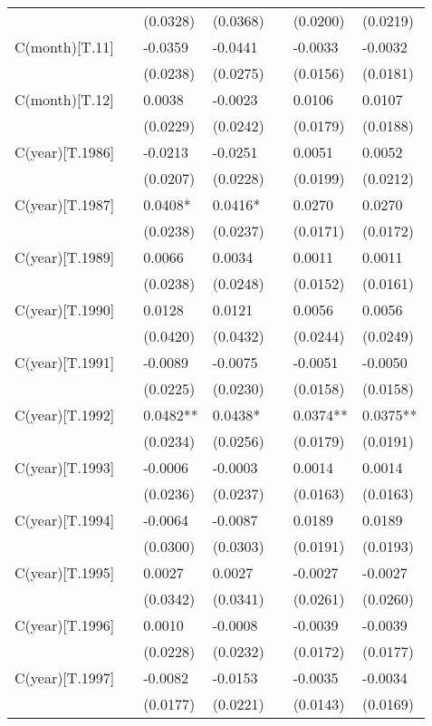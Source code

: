 \begin{tabular}{lllllll}
 &  & (0.0328) & (0.0368) &  & (0.0200) & (0.0219) \\
C(month)[T.11] &  & -0.0359 & -0.0441 &  & -0.0033 & -0.0032 \\
 &  & (0.0238) & (0.0275) &  & (0.0156) & (0.0181) \\
C(month)[T.12] &  & 0.0038 & -0.0023 &  & 0.0106 & 0.0107 \\
 &  & (0.0229) & (0.0242) &  & (0.0179) & (0.0188) \\
C(year)[T.1986] &  & -0.0213 & -0.0251 &  & 0.0051 & 0.0052 \\
 &  & (0.0207) & (0.0228) &  & (0.0199) & (0.0212) \\
C(year)[T.1987] &  & 0.0408* & 0.0416* &  & 0.0270 & 0.0270 \\
 &  & (0.0238) & (0.0237) &  & (0.0171) & (0.0172) \\
C(year)[T.1989] &  & 0.0066 & 0.0034 &  & 0.0011 & 0.0011 \\
 &  & (0.0238) & (0.0248) &  & (0.0152) & (0.0161) \\
C(year)[T.1990] &  & 0.0128 & 0.0121 &  & 0.0056 & 0.0056 \\
 &  & (0.0420) & (0.0432) &  & (0.0244) & (0.0249) \\
C(year)[T.1991] &  & -0.0089 & -0.0075 &  & -0.0051 & -0.0050 \\
 &  & (0.0225) & (0.0230) &  & (0.0158) & (0.0158) \\
C(year)[T.1992] &  & 0.0482** & 0.0438* &  & 0.0374** & 0.0375** \\
 &  & (0.0234) & (0.0256) &  & (0.0179) & (0.0191) \\
C(year)[T.1993] &  & -0.0006 & -0.0003 &  & 0.0014 & 0.0014 \\
 &  & (0.0236) & (0.0237) &  & (0.0163) & (0.0163) \\
C(year)[T.1994] &  & -0.0064 & -0.0087 &  & 0.0189 & 0.0189 \\
 &  & (0.0300) & (0.0303) &  & (0.0191) & (0.0193) \\
C(year)[T.1995] &  & 0.0027 & 0.0027 &  & -0.0027 & -0.0027 \\
 &  & (0.0342) & (0.0341) &  & (0.0261) & (0.0260) \\
C(year)[T.1996] &  & 0.0010 & -0.0008 &  & -0.0039 & -0.0039 \\
 &  & (0.0228) & (0.0232) &  & (0.0172) & (0.0177) \\
C(year)[T.1997] &  & -0.0082 & -0.0153 &  & -0.0035 & -0.0034 \\
 &  & (0.0177) & (0.0221) &  & (0.0143) & (0.0169) \\

\end{tabular}
